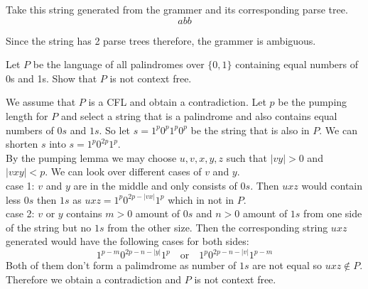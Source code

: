 \documentclass[12pt]{exam}
\begin{document}
\begin{questions}
  \begin{solution}

    Take this string generated from the grammer and its corresponding parse tree.
    \[abb\]


    Since the string has 2 parse trees therefore, the grammer is ambiguous.


  \end{solution}


  \question{}
  Let $P$ be the language of all palindromes over $\{0,1\}$ containing equal numbers of 0s and 1s. Show that $P$ is not context free.

  \begin{solution}
    We assume that $P$ is a CFL and obtain a contradiction. Let $p$ be the pumping length for $P$ and select a string that is a palindrome and also contains equal numbers of $0s$ and $1s$. So let $s = 1^{p}0^{p}1^{p}0^{p}$ be the string that is also in $P$. We can shorten $s$ into $s = 1^{p}0^{2p}1^{p}$.\\
    By the pumping lemma we may choose $u, v, x, y, z$ such that $|vy| > 0$ and $|vxy| < p$. We can look over different cases of $v$ and $y$.\\
    case 1: $v$ and $y$ are in the middle and only consists of $0s$. Then $uxz$ would contain less $0s$ then $1s$ as $uxz = 1^{p}0^{2p-|vx|}1^{p}$ which in not in $P$.\\
    case 2: $v$ or $y$ contains $m>0$ amount of $0s$ and $n>0$ amount of $1s$ from one side of the string but no $1s$ from the other size. Then the corresponding string $uxz$ generated would have the following cases for both sides:\\
    \[1^{p-m}0^{2p-n-|y|}1^{p}\quad \text{or} \quad 1^{p}0^{2p-n-|v|}1^{p-m}\]
    Both of them don't form a palimdrome as number of $1s$ are not equal so $uxz \notin P$. Therefore we obtain a contradiction and $P$ is not context free.
  \end{solution}



\end{questions}
\end{document}
